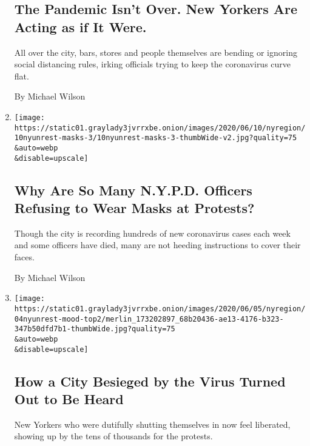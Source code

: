 \begin{enumerate}
{  \subsection{The Pandemic Isn't Over. New Yorkers Are Acting as if It
  Were.}\label{the-pandemic-isnt-over-new-yorkers-are-acting-as-if-it-were}}

  All over the city, bars, stores and people themselves are bending or
  ignoring social distancing rules, irking officials trying to keep the
  coronavirus curve flat.

  By Michael Wilson
\item
  \href{/2020/06/11/nyregion/nypd-face-masks-nyc-protests.html}{}

  \texttt{[image: https://static01.graylady3jvrrxbe.onion/images/2020/06/10/nyregion/10nyunrest-masks-3/10nyunrest-masks-3-thumbWide-v2.jpg?quality=75\\\&auto=webp\\\&disable=upscale]}

  \hypertarget{why-are-so-many-nypd-officers-refusing-to-wear-masks-at-protests}{%
  \subsection{Why Are So Many N.Y.P.D. Officers Refusing to Wear Masks
  at
  Protests?}\label{why-are-so-many-nypd-officers-refusing-to-wear-masks-at-protests}}

  Though the city is recording hundreds of new coronavirus cases each
  week and some officers have died, many are not heeding instructions to
  cover their faces.

  By Michael Wilson
\item
  \href{/2020/06/04/nyregion/floyd-nyc-protests.html}{}

  \texttt{[image: https://static01.graylady3jvrrxbe.onion/images/2020/06/05/nyregion/04nyunrest-mood-top2/merlin\_173202897\_68b20436-ae13-4176-b323-347b50dfd7b1-thumbWide.jpg?quality=75\\\&auto=webp\\\&disable=upscale]}

  \hypertarget{how-a-city-besieged-by-the-virus-turned-out-to-be-heard}{%
  \subsection{How a City Besieged by the Virus Turned Out to Be
  Heard}\label{how-a-city-besieged-by-the-virus-turned-out-to-be-heard}}

  New Yorkers who were dutifully shutting themselves in now feel
  liberated, showing up by the tens of thousands for the protests.


\end{enumerate}
